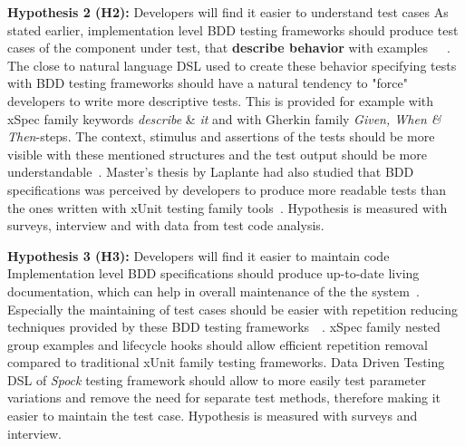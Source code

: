     \begin{addmargin}[0em]{0em}
    \vspace{10px}
    \textbf{Hypothesis 2 (H2):} Developers will find it easier to understand test cases
    \vspace{5px}
    \newline
    As stated earlier, implementation level BDD testing frameworks should produce test cases of the component under test,
    that \textbf{describe behavior} with examples~\cite{chelimsky2010rspec}~\cite{astels2006new}~\cite{amodeo2015learning}.
    The close to natural language DSL used to create these behavior specifying tests with BDD testing frameworks should
    have a natural tendency to "force" developers to write more descriptive tests. This is provided for example
    with xSpec family keywords \textit{describe} \& \textit{it} and with Gherkin family \textit{Given, When \& Then}-steps.
    The context, stimulus and assertions of the tests should be more visible with these mentioned structures and the test output
    should be more understandable~\cite{smart2014bdd}. Master's thesis by Laplante had also studied that BDD specifications
    was perceived by developers to produce more readable tests than the ones written with xUnit testing family tools~\cite{laplante2009behavior}.
    Hypothesis is measured with surveys, interview and with data from test code analysis.
    \end{addmargin}

    \begin{addmargin}[0em]{0em}
    \vspace{10px}
    \textbf{Hypothesis 3 (H3):} Developers will find it easier to maintain code
    \vspace{5px}
    \newline
    Implementation level BDD specifications should produce up-to-date living documentation, which can help in overall
    maintenance of the the system~\cite{smart2014bdd}. Especially the maintaining of test cases should be easier
    with repetition reducing techniques provided by these BDD testing frameworks~\cite{chelimsky2010rspec}~\cite{kapelonis2016java}.
    xSpec family nested group examples and lifecycle hooks should allow efficient repetition removal compared to traditional xUnit family testing frameworks.
    Data Driven Testing DSL of \textit{Spock} testing framework should allow to more easily test parameter variations and remove
    the need for separate test methods, therefore making it easier to maintain the test case.
    Hypothesis is measured with surveys and interview.
    \end{addmargin}

